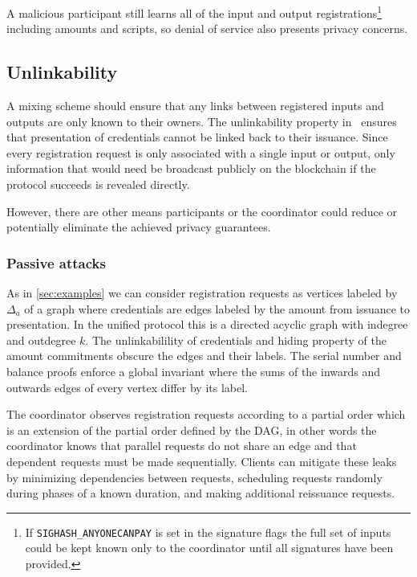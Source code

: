 \documentclass[a4paper]{article}
\begin{document}
A malicious participant still learns all of the input and output registrations\footnote{If \texttt{SIGHASH\_ANYONECANPAY} is set in the signature flags the full set of inputs could be kept known only to the coordinator until all signatures have been provided.} including amounts and scripts, so denial of service also presents privacy concerns.

\subsection{Unlinkability}

A mixing scheme should ensure that any links between registered inputs and outputs are only known to their owners. The unlinkability property in~\cite{chase2019signal} ensures that presentation of credentials cannot be linked back to their issuance. Since every registration request is only associated with a single input or output, only information that would need be broadcast publicly on the blockchain if the protocol succeeds is revealed directly.

However, there are other means participants or the coordinator could reduce or potentially eliminate the achieved privacy guarantees.

\subsubsection{Passive attacks}

As in \cref{sec:examples} we can consider registration requests as vertices labeled by $\Delta_a$ of a graph where credentials are edges labeled by the amount from issuance to presentation. In the unified protocol this is a directed acyclic graph with indegree and outdegree $k$. The unlinkabilility of credentials and hiding property of the amount commitments obscure the edges and their labels. The serial number and balance proofs enforce a global invariant where the sums of the inwards and outwards edges of every vertex differ by its label.

The coordinator observes registration requests according to a partial order which is an extension of the partial order defined by the DAG, in other words the coordinator knows that parallel requests do not share an edge and that dependent requests must be made sequentially. Clients can mitigate these leaks by minimizing dependencies between requests, scheduling requests randomly during phases of a known duration, and making additional reissuance requests.
\end{document}

